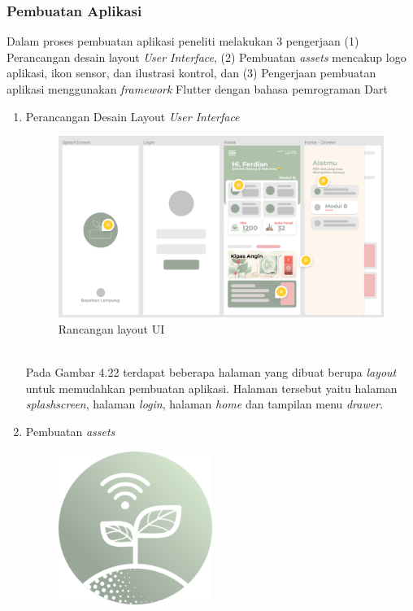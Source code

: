\begin{flushleft}
\begin{justify}
        \subsubsection{Pembuatan Aplikasi}
        Dalam proses pembuatan aplikasi peneliti melakukan 3 pengerjaan (1) Perancangan desain layout \textit{User Interface}, (2) Pembuatan \textit{assets} mencakup logo aplikasi, ikon sensor, dan ilustrasi kontrol, dan (3) Pengerjaan pembuatan aplikasi menggunakan \textit{framework} Flutter dengan bahasa pemrograman Dart
        \begin{enumerate}
            \item Perancangan Desain Layout \textit{User Interface}
            \begin{figure}[ht]
                \centering
                \includegraphics[width=13cm]{images/UI/summary.png}
                \caption{Rancangan layout UI}
            \end{figure}
            \\Pada Gambar 4.22 terdapat beberapa halaman yang dibuat berupa \emph{layout} untuk memudahkan pembuatan aplikasi. Halaman
            tersebut yaitu halaman \emph{splashscreen}, halaman \emph{login}, halaman \emph{home} dan tampilan menu \emph{drawer}.\\
            \item Pembuatan \textit{assets}\\
            \begin{figure}[ht]
                \centering
                \includegraphics[width=5cm]{images/logo.png}

\end{figure}
\end{enumerate}
\end{justify}
\end{flushleft}

